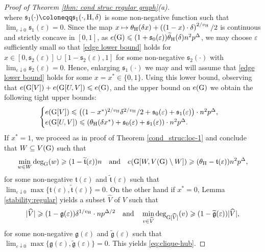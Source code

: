 \documentclass[a4paper,11pt,english,reqno]{amsart}
\numberwithin{equation}{section}
\renewcommand{\leq}{\leqslant}
\renewcommand{\geq}{\geqslant}
\newcommand{\uH}{\textup{H}}
\newcommand{\tu}[1]{\textup{#1}}
\begin{document}
\begin{proof}[Proof of Theorem \ref{thm: cond struc regular graph}(a)]
\begin{equation}
\end{equation}
where %
$\mathfrak{s}_{1}(\cdot) \coloneqq \mathfrak{s}_{1}(\cdot,\uH, \delta)$ is some non-negative function such that $\lim_{\varepsilon\downarrow0} \mathfrak{s}_{1}(\varepsilon) = 0$.
Since the map $x\mapsto \theta_{\uH}(\delta x)+\left((1-x)\cdot \delta\right)^{2/v_{\uH}}/2$ is continuous and strictly concave in $[0,1]$, as $e(\tu{G}) \leq (1+\mathfrak{s}_0(\varepsilon))\widetilde \theta_{\uH}(\delta)n^2p^\Delta$, we may choose  $\varepsilon$ sufficiently small so that  \eqref{edge lower bound} holds for $x \in [0, \mathfrak{s}_{2}(\varepsilon)] \cup [1-\mathfrak{s}_{2}(\varepsilon),1]$ for some non-negative $\mathfrak{s}_2(\cdot)$ with $\lim_{\varepsilon \downarrow 0} \mathfrak{s}_2(\varepsilon)=0$. Hence, enlarging $\mathfrak{s}_1(\cdot)$ we may and will assume that  \eqref{edge lower bound}  holds for some $x=x^{*}\in \{0,1\}$. Using this lower bound, observing that $e(\tu{G}[V])+e(\tu{G}[U,V])\leq e(\tu{G})$, and the upper bound on $e(\tu{G})$ we obtain the following tight upper bounds:
\begin{equation}
	\begin{cases}
		e(\tu{G}[V])\leq \left((1-x^{*})^{2/v_{\uH}}\delta^{2/v_{\uH}}/2+\mathfrak{s}_{0}(\varepsilon)+\mathfrak{s}_{1}(\varepsilon)\right)\cdot n^{2}p^{\Delta},\\
		e(\tu{G}[U,V])\leq \left(\theta_{\uH}(\delta x^{*})+\mathfrak{s}_{0}(\varepsilon)+\mathfrak{s}_{1}(\varepsilon)\right) \cdot n^{2}p^{\Delta}.
	\end{cases}
\end{equation} 
If $x^{*}=1$, we proceed as in proof of Theorem \ref{cond_struc:loc-1} and conclude that $W\subseteq V(\tu{G})$ such that
\begin{equation*}
	\min_{w\in W}\tu{deg}_{\tu{G}}(w)\geq (1-\widetilde{\mathfrak{t}}(\varepsilon))n\quad \text{and}\quad e(\tu{G}[W, V(\tu{G})\setminus W])\geq (\theta_{\uH}-\mathfrak{t}(\varepsilon))n^{2}p^{\Delta},
\end{equation*}
for some non-negative $\mathfrak{t}(\varepsilon)$ and $\widetilde{\mathfrak{t}}(\varepsilon)$ such that $\lim_{\varepsilon\downarrow 0}\max\{\mathfrak{t}(\varepsilon), \widetilde{\mathfrak{t}}(\varepsilon)\}=0$. On the other hand if $x^{*}=0$, Lemma \ref{stability:regular} yields a subset $\widehat{V}$ of $V$ such that 
\begin{equation*}
	|\widehat{V}|\geq (1-\mathfrak{g}(\varepsilon))\delta^{1/v_{\uH}} \cdot np^{\Delta/2}
	\quad \text{and}\quad \min_{v\in \widehat{V}}\tu{deg}_{\tu{G}[\widehat{V}]}(v)\geq (1-\widetilde{\mathfrak{g}}(\varepsilon))|\widehat{V}|,
\end{equation*}
for some non-negative $\mathfrak{g}(\varepsilon)$ and $\widetilde{\mathfrak{g}}(\varepsilon)$ such that $\lim_{\varepsilon\downarrow 0}\max\{\mathfrak{g}(\varepsilon), \widetilde{\mathfrak{g}}(\varepsilon)\}=0$. This yields \eqref{eq:clique-hub}. 


\end{proof}
\end{document}
